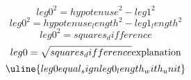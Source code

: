 \[ {leg0}^{2}={hypotenuse}^{2}-{leg1}^{2} \]
\[ {leg0}^{2}={hypotenuse_length}^{2}-{leg1_length}^{2} \]
\[ {leg0}^{2}={squares_difference} \]
\[ {leg0}=\sqrt{\mathstrut {squares_difference}}\text{{explanation}}\]
\[ \uline{{leg0}{equal_sign}{leg0_length_with_unit}}\]